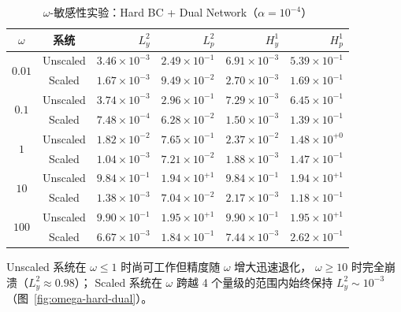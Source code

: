 \documentclass[UTF8, 12pt]{ctexart}
\begin{document}
\begin{table}[H]
  \centering
  \caption{$\omega$-敏感性实验：Hard BC + Dual Network（$\alpha=10^{-4}$）}
  \label{tab:omega-hard-dual}
  \small
  \begin{tabular}{cc rrrr}
    \toprule
    $\omega$ & 系统 & $L^2_y$ & $L^2_p$ & $H^1_y$ & $H^1_p$ \\
    \midrule
    \multirow{2}{*}{$0.01$}
      & Unscaled & $3.46\times10^{-3}$ & $2.49\times10^{-1}$
                 & $6.91\times10^{-3}$ & $5.39\times10^{-1}$ \\
      & Scaled   & $1.67\times10^{-3}$ & $9.49\times10^{-2}$
                 & $2.70\times10^{-3}$ & $1.69\times10^{-1}$ \\
    \midrule
    \multirow{2}{*}{$0.1$}
      & Unscaled & $3.74\times10^{-3}$ & $2.96\times10^{-1}$
                 & $7.29\times10^{-3}$ & $6.45\times10^{-1}$ \\
      & Scaled   & $7.48\times10^{-4}$ & $6.28\times10^{-2}$
                 & $1.50\times10^{-3}$ & $1.39\times10^{-1}$ \\
    \midrule
    \multirow{2}{*}{$1$}
      & Unscaled & $1.82\times10^{-2}$ & $7.65\times10^{-1}$
                 & $2.37\times10^{-2}$ & $1.48\times10^{+0}$ \\
      & Scaled   & $1.04\times10^{-3}$ & $7.21\times10^{-2}$
                 & $1.88\times10^{-3}$ & $1.47\times10^{-1}$ \\
    \midrule
    \multirow{2}{*}{$10$}
      & Unscaled & $9.84\times10^{-1}$ & $1.94\times10^{+1}$
                 & $9.84\times10^{-1}$ & $1.94\times10^{+1}$ \\
      & Scaled   & $1.38\times10^{-3}$ & $7.04\times10^{-2}$
                 & $2.17\times10^{-3}$ & $1.18\times10^{-1}$ \\
    \midrule
    \multirow{2}{*}{$100$}
      & Unscaled & $9.90\times10^{-1}$ & $1.95\times10^{+1}$
                 & $9.90\times10^{-1}$ & $1.95\times10^{+1}$ \\
      & Scaled   & $6.67\times10^{-3}$ & $1.84\times10^{-1}$
                 & $7.44\times10^{-3}$ & $2.62\times10^{-1}$ \\
    \bottomrule
  \end{tabular}
\end{table}

Unscaled 系统在 $\omega \leq 1$ 时尚可工作但精度随 $\omega$ 增大迅速退化，
$\omega \geq 10$ 时完全崩溃（$L^2_y \approx 0.98$）；
Scaled 系统在 $\omega$ 跨越 4 个量级的范围内始终保持
$L^2_y \sim 10^{-3}$（图~\ref{fig:omega-hard-dual}）。
\end{document}

